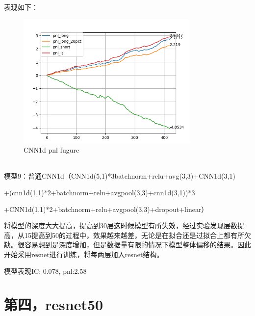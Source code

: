 \documentclass[11pt]{ctexart}
\begin{document}
表现如下：
\begin{figure}[H]

\begin{center}
\includegraphics[width=0.8\textwidth]{1.PNG}
\end{center}
\caption{CNN1d pnl fugure}
\label{FIG.1}
\end{figure}

~\\
模型9：普通CNN1d（CNN1d(5,1)*3batchnorm+relu+avg(3,3)+CNN1d(3,1)

+(cnn1d(1,1)*2+batchnorm+relu+avgpool(3,3)+cnn1d(3,1))*3

+CNN1d(1,1)*2+batchnorm+relu+avgpool(3,3)+dropout+linear）

将模型的深度大大提高，提高到30层这时候模型有所失效，经过实验发现层数提高，从15提高到50的过程中，效果越来越差，无论是在拟合还是过拟合上都有所欠缺。很容易想到是深度增加，但是数据量有限的情况下模型整体偏移的结果。因此开始采用resnet进行训练，将每两层加入resnet结构。

模型表现{\kaishu \small IC: 0.078, pnl:2.58}

\iffalse  %
\section{第四，resnet50}
\end{document}
